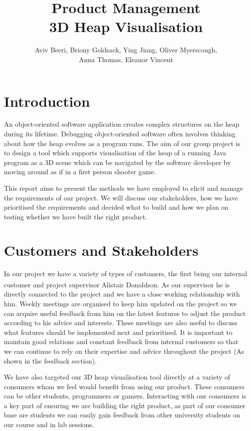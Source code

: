 \documentclass[10pt, a4paper]{article}
\begin{document}
\title{Product Management
\\ 3D Heap Visualisation}
\author{Aviv Beeri, Briony Goldsack, Ying Jiang, Oliver Myerscough,
\\ Anna Thomas, Eleanor Vincent}
\maketitle


\section{Introduction}

An object-oriented software application creates complex structures on the heap during its lifetime. Debugging object-oriented software often involves thinking about how the heap evolves as a program runs. The aim of our group project is to design a tool which supports visualisation of the heap of a running Java program as a 3D scene which can be navigated by the software developer by moving around as if in a first person shooter game.

This report aims to present the methods we have employed to elicit and manage the requirements of our project. We will discuss our stakeholders, how we have prioritised the requirements and decided what to build and how we plan on testing whether we have built the right product. 

\section{Customers and Stakeholders}

In our project we have a variety of types of customers, the first being our internal customer\textsuperscript{\cite{internal,internal2}} and project supervisor Alistair Donaldson. As our supervisor he is directly connected to the project and we have a close working relationship with him. Weekly meetings are organised to keep him updated on the project so we can acquire useful feedback from him on the latest features to adjust the product according to his advice and interests. These meetings are also useful to discuss what features should be implemented next and prioritised. It is important to maintain good relations and constant feedback from internal customers so that we can continue to rely on their expertise and advice throughout the project (As shown in the feedback section).

We have also targeted our 3D heap visualisation tool directly at a variety of consumers whom we feel would benefit from using our product. These consumers can be other students, programmers or gamers. Interacting with our consumers is a key part of ensuring we are building the right product, as part of our consumer base are students we can easily gain feedback from other university students on our course and in lab sessions.
\end{document}
